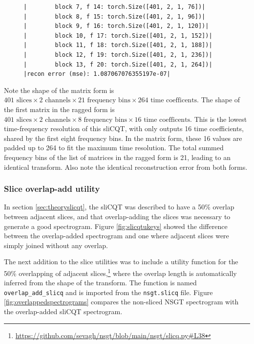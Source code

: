 \documentclass[report.tex]{subfiles}
\begin{document}
\begin{figure}[h]
\begin{minipage}{\textwidth}
\begin{verbatim}
|        block 7, f 14: torch.Size([401, 2, 1, 76])|
|        block 8, f 15: torch.Size([401, 2, 1, 96])|
|        block 9, f 16: torch.Size([401, 2, 1, 120])|
|        block 10, f 17: torch.Size([401, 2, 1, 152])|
|        block 11, f 18: torch.Size([401, 2, 1, 188])|
|        block 12, f 19: torch.Size([401, 2, 1, 236])|
|        block 13, f 20: torch.Size([401, 2, 1, 264])|
|recon error (mse): 1.087067076355197e-07|
\end{verbatim}
 \vspace{1em}
 \end{minipage}
  \label{code:raggedvmatrix}
\end{figure}

Note the shape of the matrix form is $401 \text{ slices} \times 2 \text{ channels} \times 21 \text{ frequency bins} \times 264 \text{ time coefficents}$. The shape of the first matrix in the ragged form is $401 \text{ slices} \times 2 \text{ channels} \times 8 \text{ frequency bins} \times 16 \text{ time coefficents}$. This is the lowest time-frequency resolution of this sliCQT, with only outputs 16 time coefficients, shared by the first eight frequency bins. In the matrix form, these 16 values are padded up to 264 to fit the maximum time resolution. The total summed frequency bins of the list of matrices in the ragged form is 21, leading to an identical transform. Also note the identical reconstruction error from both forms.

\subsubsection{Slice overlap-add utility}
\label{sec:slicqola}

In section \ref{sec:theoryslicqt}, the sliCQT was described to have a 50\% overlap between adjacent slices, and that overlap-adding the slices was necessary to generate a good spectrogram. Figure \ref{fig:slicqtukeys} showed the difference between the overlap-added spectrogram and one where adjacent slices were simply joined without any overlap.

The next addition to the slice utilities was to include a utility function for the 50\% overlapping of adjacent slices,\footnote{\url{https://github.com/sevagh/nsgt/blob/main/nsgt/slicq.py\#L38}} where the overlap length is automatically inferred from the shape of the transform. The function is named \Verb#overlap_add_slicq# and is imported from the \Verb#nsgt.slicq# file. Figure \ref{fig:overlappedspectrograms} compares the non-sliced NSGT spectrogram with the overlap-added sliCQT spectrogram.
\end{document}
